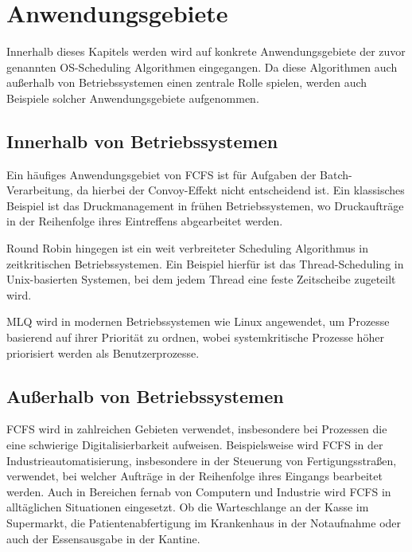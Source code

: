 \chapter{Anwendungsgebiete}
Innerhalb dieses Kapitels werden wird auf konkrete Anwendungsgebiete der zuvor genannten OS-Scheduling Algorithmen eingegangen. Da diese Algorithmen auch außerhalb von Betriebssystemen einen zentrale Rolle spielen, werden auch Beispiele solcher Anwendungsgebiete aufgenommen.

\section{Innerhalb von Betriebssystemen}
Ein häufiges Anwendungsgebiet von \ac{FCFS} ist für Aufgaben der Batch-Verarbeitung, da hierbei der Convoy-Effekt nicht entscheidend ist. Ein klassisches Beispiel ist das Druckmanagement in frühen Betriebssystemen, wo Druckaufträge in der Reihenfolge ihres Eintreffens abgearbeitet werden.  %

Round Robin hingegen ist ein weit verbreiteter Scheduling Algorithmus in zeitkritischen Betriebssystemen. Ein Beispiel hierfür ist das Thread-Scheduling in Unix-basierten Systemen, bei dem jedem Thread eine feste Zeitscheibe zugeteilt wird. %

\ac{MLQ} wird in modernen Betriebssystemen wie Linux angewendet, um Prozesse basierend auf ihrer Priorität zu ordnen, wobei systemkritische Prozesse höher priorisiert werden als Benutzerprozesse. %

\section{Außerhalb von Betriebssystemen}
\ac{FCFS} wird in zahlreichen Gebieten verwendet, insbesondere bei Prozessen die eine schwierige Digitalisierbarkeit aufweisen. Beispielsweise wird \ac{FCFS} in der Industrieautomatisierung, insbesondere in der Steuerung von Fertigungsstraßen, verwendet, bei welcher Aufträge in der Reihenfolge ihres Eingangs bearbeitet werden. %
Auch in Bereichen fernab von Computern und Industrie wird \ac{FCFS} in alltäglichen Situationen eingesetzt. Ob die Warteschlange an der Kasse im Supermarkt, die Patientenabfertigung im Krankenhaus in der Notaufnahme oder auch der Essensausgabe in der Kantine. 

